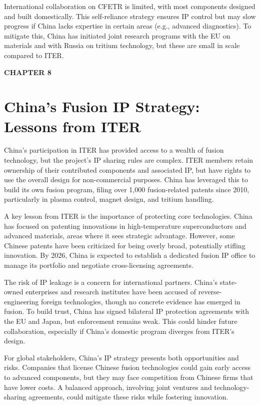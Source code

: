 \documentclass[11pt,a4paper]{article}
\newcommand{\kicker}[1]{\textcolor{BOBlue}{\scriptsize\bfseries\MakeUppercase{#1}}\\[-2pt]}
\newcommand{\lead}[1]{\textcolor{BOBlue}{\large #1}\par\vspace{3pt}}
\begin{document}
{\small International collaboration on CFETR is limited, with most components designed and built domestically. This self-reliance strategy ensures IP control but may slow progress if China lacks expertise in certain areas (e.g., advanced diagnostics). To mitigate this, China has initiated joint research programs with the EU on materials and with Russia on tritium technology, but these are small in scale compared to ITER.}




\clearpage
\kicker{Chapter 8}
\section*{China's Fusion IP Strategy: Lessons from ITER}
\lead{}
{\small China's participation in ITER has provided access to a wealth of fusion technology, but the project's IP sharing rules are complex. ITER members retain ownership of their contributed components and associated IP, but have rights to use the overall design for non-commercial purposes. China has leveraged this to build its own fusion program, filing over 1,000 fusion-related patents since 2010, particularly in plasma control, magnet design, and tritium handling.}

{\small A key lesson from ITER is the importance of protecting core technologies. China has focused on patenting innovations in high-temperature superconductors and advanced materials, areas where it sees strategic advantage. However, some Chinese patents have been criticized for being overly broad, potentially stifling innovation. By 2026, China is expected to establish a dedicated fusion IP office to manage its portfolio and negotiate cross-licensing agreements.}

{\small The risk of IP leakage is a concern for international partners. China's state-owned enterprises and research institutes have been accused of reverse-engineering foreign technologies, though no concrete evidence has emerged in fusion. To build trust, China has signed bilateral IP protection agreements with the EU and Japan, but enforcement remains weak. This could hinder future collaboration, especially if China's domestic program diverges from ITER's design.}

{\small For global stakeholders, China's IP strategy presents both opportunities and risks. Companies that license Chinese fusion technologies could gain early access to advanced components, but they may face competition from Chinese firms that have lower costs. A balanced approach, involving joint ventures and technology-sharing agreements, could mitigate these risks while fostering innovation.}
\end{document}
